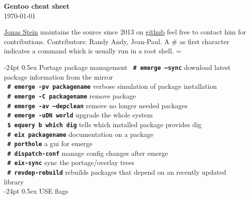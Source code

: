 \documentclass[landscape]{article}
\makeatletter
\renewcommand\section{\@startsection{section}{1}{0mm}%
                                     {-24pt}%
                                     {0.5ex}%
                                {\color{black}\normalfont\large\bfseries}}
\newcommand{\code}{\texttt}
\newcommand{\bcode}[1]{\texttt{\textbf{\color{blue} #1}}}
\newcommand{\asroot}{\# }
\newcommand{\asuser}{\$ }
\makeatother
\begin{document}
\footnotesize
\begin{multicols*}{2}

\setlength{\premulticols}{1pt}
\setlength{\postmulticols}{1pt}
\setlength{\multicolsep}{1pt}
\setlength{\columnsep}{2pt}

\begin{center}
     {\Large{\textbf{\color{black}Gentoo cheat sheet}}} \\
 \today
\end{center}
\href{mailto:news@jonasstein.de}{Jonas Stein} maintains 
the source since 2013 on \href{https://github.com/jonasstein/gentoo-cheat}{github} feel free to contact him for contributions. Contributors: Randy Andy, Jean-Paul.
A \asroot as first character indicates a command which is usually run in a root shell.
\everypar={\hangindent=9mm}

\section{Portage package management}
\bcode{\asroot emerge --sync} download latest package information from the mirror\\
\bcode{\asroot emerge -pv packagename} verbose simulation of package installation\\ 
\bcode{\asroot emerge -C packagename} remove package\\ 
\bcode{\asroot emerge -av --depclean} remove no longer needed packages\\
\bcode{\asroot emerge -uDN world} upgrade the whole system\\
\bcode{\asuser equery b \textacutedbl which dig\textacutedbl} tells which installed package provides dig\\
\bcode{\asroot eix packagename} documentation on a package\\ %
\bcode{\asroot porthole} a gui for emerge\\
\bcode{\asroot dispatch-conf} manage config changes after emerge\\
\bcode{\asroot eix-sync} sync the portage/overlay trees\\
\bcode{\asroot revdep-rebuild} rebuilds packages that depend on an recently updated library\\

\section{USE flags}


\end{multicols*}
\end{document}
